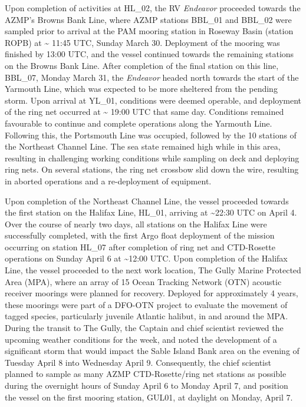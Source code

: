 \documentclass[12pt]{article}\usepackage[]{graphicx}\usepackage[]{color}
\begin{document}
Upon completion of activities at HL\_02, the RV \emph{Endeavor} proceeded towards the AZMP's Browns Bank Line, where AZMP stations BBL\_01 and BBL\_02 were sampled prior to arrival at the PAM mooring station in Roseway Basin (station ROPB) at \textasciitilde{} 11:45 UTC, Sunday March 30. Deployment of the mooring was finished by 13:00 UTC, and the vessel continued towards the remaining stations on the Browns Bank Line. After completion of the final station on this line, BBL\_07, Monday March 31, the \emph{Endeavor} headed north towards the start of the Yarmouth Line, which was expected to be more sheltered from the pending storm. Upon arrival at YL\_01, conditions were deemed operable, and deployment of the ring net occurred at \textasciitilde{} 19:00 UTC that same day. Conditions remained favourable to continue and complete operations along the Yarmouth Line. Following this, the Portsmouth Line was occupied, followed by the 10 stations of the Northeast Channel Line. The sea state remained high while in this area, resulting in challenging working conditions while sampling on deck and deploying ring nets. On several stations, the ring net crossbow slid down the wire, resulting in aborted operations and a re-deployment of equipment.

Upon completion of the Northeast Channel Line, the vessel proceeded towards the first station on the Halifax Line, HL\_01, arriving at \textasciitilde22:30 UTC on April 4. Over the course of nearly two days, all stations on the Halifax Line were successfully completed, with the first Argo float deployment of the mission occurring on station HL\_07 after completion of ring net and CTD-Rosette operations on Sunday April 6 at \textasciitilde12:00 UTC. Upon completion of the Halifax Line, the vessel proceeded to the next work location, The Gully Marine Protected Area (MPA), where an array of 15 Ocean Tracking Network (OTN) acoustic receiver moorings were planned for recovery. Deployed for approximately 4 years, these moorings were part of a DFO-OTN project to evaluate the movement of tagged species, particularly juvenile Atlantic halibut, in and around the MPA. During the transit to The Gully, the Captain and chief scientist reviewed the upcoming weather conditions for the week, and noted the development of a significant storm that would impact the Sable Island Bank area on the evening of Tuesday April 8 into Wednesday April 9. Consequently, the chief scientist planned to sample as many AZMP CTD-Rosette/ring net stations as possible during the overnight hours of Sunday April 6 to Monday April 7, and position the vessel on the first mooring station, GUL01, at daylight on Monday, April 7.
\end{document}
